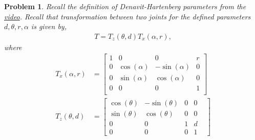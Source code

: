 \documentclass[twocolumn]{article}
\newtheorem{prob}{Problem}
\begin{document}
\begin{prob}
  Recall the definition of Denavit-Hartenberg parameters from the
  \href{https://www.youtube.com/watch?v=rA9tm0gTln8}{video}. Recall that
  transformation between two joints for the defined parameters $d, \theta, r,
  \alpha$ is given by,
  \begin{align}
    T = T_z(\theta, d) T_x(\alpha, r),
  \end{align}
  where
  \begin{align}
    T_x(\alpha, r) &= \begin{bmatrix}
      1 & 0 & 0 & r \\
      0 & \cos(\alpha) & -\sin(\alpha) & 0 \\
      0 & \sin(\alpha) & \cos(\alpha) & 0 \\
      0 & 0 & 0 & 1 \\
      \end{bmatrix}
    \\
    T_z(\theta, d) &= \begin{bmatrix}
      \cos(\theta) & -\sin(\theta) & 0 &  0 \\
      \sin(\theta) & \cos(\theta) & 0  & 0 \\
      0 & 0 & 1 & d & \\
      0 & 0 & 0 & 1 &
    \end{bmatrix}
  \end{align}


\end{prob}
\end{document}

